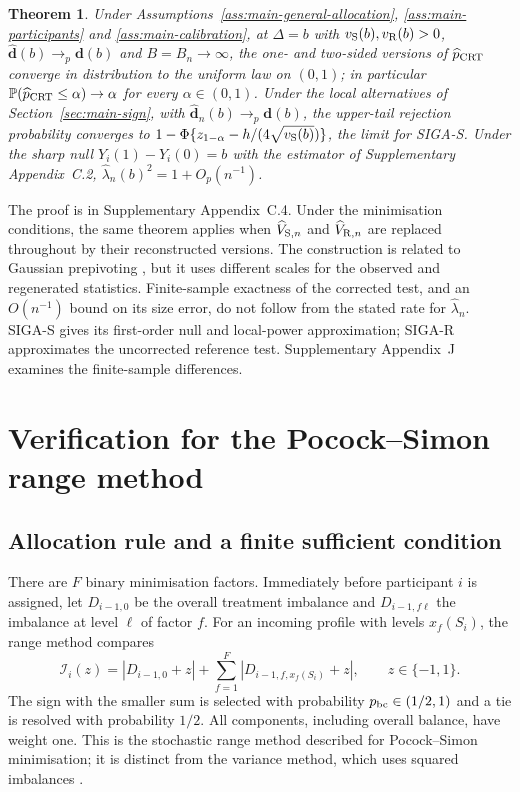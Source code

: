 \documentclass[12pt,a4paper]{article}
\newtheorem{theorem}{Theorem}
\theoremstyle{definition}
\newcommand{\Pbb}{\mathbb P}
\begin{document}
\begin{theorem}\label{thm:crt}
Under Assumptions~\ref{ass:main-general-allocation}, \ref{ass:main-participants} and \ref{ass:main-calibration}, at $\Delta=b$ with $v_{\rm S}(b),v_{\rm R}(b)>0$, $\widehat{\bm d}(b)\to_p\bm d(b)$ and $B=B_n\to\infty$, the one- and two-sided versions of $\widehat p_{\rm CRT}$ converge in distribution to the uniform law on $(0,1)$; in particular $\Pbb(\widehat p_{\rm CRT}\le\alpha)\to\alpha$ for every $\alpha\in(0,1)$. Under the local alternatives of Section~\ref{sec:main-sign}, with $\widehat{\bm d}_n(b)\to_p\bm d(b)$, the upper-tail rejection probability converges to $1-\Phi\{z_{1-\alpha}-h/(4\sqrt{v_{\rm S}(b)})\}$, the limit for SIGA-S. Under the sharp null $Y_i(1)-Y_i(0)=b$ with the estimator of Supplementary Appendix~C.2, $\widehat\lambda_n(b)^2=1+O_p(n^{-1})$.
\end{theorem}
The proof is in Supplementary Appendix~C.4. Under the minimisation conditions, the same theorem applies when $\widehat V_{{\rm S},n}$ and $\widehat V_{{\rm R},n}$ are replaced throughout by their reconstructed versions. The construction is related to Gaussian prepivoting \citep{CohenFogarty2022}, but it uses different scales for the observed and regenerated statistics. Finite-sample exactness of the corrected test, and an $O(n^{-1})$ bound on its size error, do not follow from the stated rate for $\widehat\lambda_n$. SIGA-S gives its first-order null and local-power approximation; SIGA-R approximates the uncorrected reference test. Supplementary Appendix~J examines the finite-sample differences.

\section{Verification for the Pocock--Simon range method}\label{sec:minimization}
\subsection{Allocation rule and a finite sufficient condition}
There are $F$ binary minimisation factors. Immediately before participant $i$ is assigned, let $D_{i-1,0}$ be the overall treatment imbalance and $D_{i-1,f\ell}$ the imbalance at level $\ell$ of factor $f$. For an incoming profile with levels $x_f(S_i)$, the range method compares
\begin{equation}\label{eq:min-score}
 \mathcal I_i(z)=|D_{i-1,0}+z|+
  \sum_{f=1}^F|D_{i-1,f,x_f(S_i)}+z|,\qquad z\in\{-1,1\}.
\end{equation}
The sign with the smaller sum is selected with probability $p_{\rm bc}\in(1/2,1)$ and a tie is resolved with probability $1/2$. All components, including overall balance, have weight one. This is the stochastic range method described for Pocock--Simon minimisation; it is distinct from the variance method, which uses squared imbalances \citep{CoartEtAl2023}.
\end{document}
